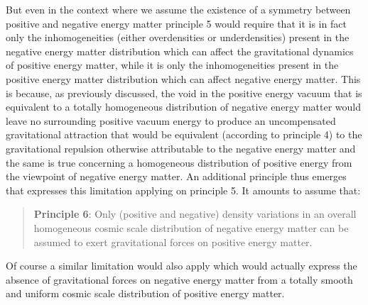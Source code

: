 \documentclass[notitlepage,12pt]{report}
\begin{document}
But even in the context where we assume the existence of a symmetry between positive and negative energy matter principle 5 would require that it is in fact only the inhomogeneities (either overdensities or underdensities) present in the negative energy matter distribution which can affect the gravitational dynamics of positive energy matter, while it is only the inhomogeneities present in the positive energy matter distribution which can affect negative energy matter. This is because, as previously discussed, the void in the positive energy vacuum that is equivalent to a totally homogeneous distribution of negative energy matter would leave no surrounding positive vacuum energy to produce an uncompensated gravitational attraction that would be equivalent (according to principle 4) to the gravitational repulsion otherwise attributable to the negative energy matter and the same is true concerning a homogeneous distribution of positive energy from the viewpoint of negative energy matter. An additional principle thus emerges that expresses this limitation applying on principle 5. It amounts to assume that:
\begin{quote}
\textbf{Principle 6}: Only (positive and negative) density variations in an overall homogeneous cosmic scale distribution of negative energy matter can be assumed to exert gravitational forces on positive energy matter.
\end{quote}
Of course a similar limitation would also apply which would actually express the absence of gravitational forces on negative energy matter from a totally smooth and uniform cosmic scale distribution of positive energy matter.
\end{document}
